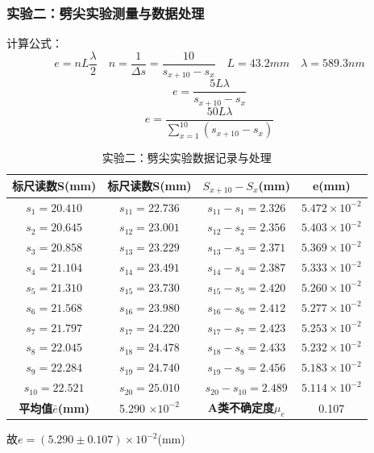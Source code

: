 \documentclass[]{../template/Report}%
\begin{document}
\begin{fullreportonly}
\subsubsection{实验二：劈尖实验测量与数据处理}
计算公式：
\[
e = nL\frac{\lambda}{2} \quad n = \frac{1}{\Delta s} = \frac{10}{s_{x+10}-s_x} \quad L = 43.2mm \quad \lambda = 589.3nm
\]
\[
e = \frac{5L \lambda}{s_{x+10}-s_x}
\]
\[
e = \frac{50L \lambda}{\sum_{x=1}^{10}(s_{x+10}-s_x)}
\]
\begin{table}[H]
    \centering
    \caption{实验二：劈尖实验数据记录与处理}
    \begin{tabular}{|c|c|c|c|}
        \hline
        \textbf{标尺读数S(mm)} & \textbf{标尺读数S(mm)} & \textbf{$S_{x+10}-S_x$(mm)} & \textbf{e(mm)}  \\
        \hline
        $s_1 = 20.410$ & $s_{11} = 22.736$ & $s_{11}-s_1 = 2.326$ & $5.472 \times 10^{-2}$  \\
        \hline
        $s_2 = 20.645$ & $s_{12} = 23.001$ & $s_{12}-s_2 = 2.356$ & $5.403 \times 10^{-2}$  \\
        \hline
        $s_3 = 20.858$ & $s_{13} = 23.229$ & $s_{13}-s_3 = 2.371$ & $5.369 \times 10^{-2}$ \\
        \hline
        $s_4 = 21.104$ & $s_{14} = 23.491$ & $s_{14}-s_4 = 2.387$ & $5.333 \times 10^{-2}$  \\
        \hline
        $s_5 = 21.310$ & $s_{15} = 23.730$ & $s_{15}-s_5 = 2.420$ & $5.260 \times 10^{-2}$  \\
        \hline
        $s_6 = 21.568$ & $s_{16} = 23.980$ & $s_{16}-s_6 = 2.412$ & $5.277 \times 10^{-2}$  \\
        \hline
        $s_7 = 21.797$ & $s_{17} = 24.220$ & $s_{17}-s_7 = 2.423$ & $5.253 \times 10^{-2}$  \\
        \hline
        $s_8 = 22.045$ & $s_{18} = 24.478$ & $s_{18}-s_8 = 2.433$ & $5.232 \times 10^{-2}$  \\
        \hline
        $s_9 = 22.284$ & $s_{19} = 24.740$ & $s_{19}-s_9 = 2.456$ & $5.183 \times 10^{-2}$  \\
        \hline
        $s_{10} = 22.521$ & $s_{20} = 25.010$ & $s_{20}-s_{10} = 2.489$ & $5.114 \times 10^{-2}$  \\
        \hline
        \textbf{平均值$\bar{e}$(mm)} & 5.290 $\times 10^{-2}$ & \textbf{A类不确定度$\mu_e$} & 0.107 \\
        \hline
    \end{tabular}
\end{table}
故$e = (5.290 \pm 0.107) \times 10^{-2}$(mm)


\end{fullreportonly}
\end{document}
